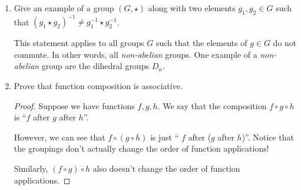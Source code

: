 \documentclass{article}
\begin{document}
\begin{enumerate}
{\begin{proof}
        As an inductive hypothesis, we say 
        \[         (g_1 * g_2 * \dots * g_n)^{-1} = g_n^{-1} * \dots * g_2^{-1} * g_1^{-1}.      \]
        for \(n \le k\). 

        Thus, we have 
        \[         (g_1 * g_2 * \dots * g_k)^{-1} = g_k^{-1} * \dots * g_2^{-1} * g_1^{-1}.      \]

        We can show that our proposition holds for \(n = k+1\) with
        \begin{align*}
            (g_1 * g_2 * \dots * g_k * g_{k+1})^{-1}\\
            ((g_1 * g_2 * \dots * g_k) * g_{k+1})^{-1}\\
            (g_{k+1})^{-1} * (g_1 * g_2 * \dots * g_k)^{-1}\\
            g_{k+1}^{-1} * g_k^{-1} * \dots * g_2^{-1} * g_1^{-1}
        \end{align*}

        Therefore, for all \(n \geq 1\),
      \[         (g_1 * g_2 * \dots * g_n)^{-1} = g_n^{-1} * \dots * g_2^{-1} * g_1^{-1}.      \]

      \end{proof}
    }

    \item {
        Give an example of a group \((G,\star)\) along with two elements \(g_1, g_2 \in G\) such that \((g_1 \star g_2)^{-1} \neq g_1^{-1} \star g_2^{-1}\).
    
        This statement applies to all groups \(G\) such that the elements of 
        \(g \in G\) do not commute. In other words, all \emph{non-abelian} groups.
        One example of a \emph{non-abelian} group are the dihedral groups \(D_n\). 
    }

    \item 
        Prove that function composition is associative.

        \begin{proof}
            Suppose we have functions \(f, g, h\). We say that the composition
            \(f \circ g \circ h\) is ``\(f\) after \(g\) after \(h\)''.

            However, we can see that \(f \circ (g \circ h)\) is just ``
            \(f\) after (\(g\) after \(h\))''. Notice that the groupings don't 
            actually change the order of function applications!

            Similarly, \((f \circ g) \circ h\) also doesn't change the order 
            of function applications. 


\end{proof}
\end{enumerate}
\end{document}
